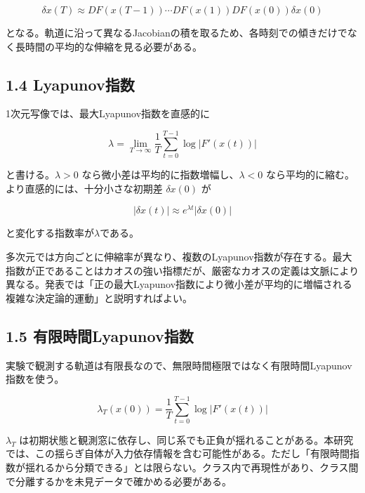 \documentclass[11pt,a4paper]{ltjsarticle}
\begin{document}
\[
\delta x(T)\approx DF\!\left(x(T-1)\right)\cdots DF\!\left(x(1)\right)DF\!\left(x(0)\right)\delta x(0)
\]

となる。軌道に沿って異なるJacobianの積を取るため、各時刻での傾きだけでなく長時間の平均的な伸縮を見る必要がある。\par

\subsection*{\textcolor{researchblue}{1.4 Lyapunov指数}}

1次元写像では、最大Lyapunov指数を直感的に\par

\[
\lambda=\lim_{T\to\infty}\frac{1}{T}\sum_{t=0}^{T-1}\log\left|F'\!\left(x(t)\right)\right|
\]

と書ける。\(\lambda>0\) なら微小差は平均的に指数増幅し、\(\lambda<0\) なら平均的に縮む。より直感的には、十分小さな初期差 \(\delta x(0)\) が\par

\[
\left|\delta x(t)\right|\approx e^{\lambda t}\left|\delta x(0)\right|
\]

と変化する指数率が\(\lambda\)である。\par

多次元では方向ごとに伸縮率が異なり、複数のLyapunov指数が存在する。最大指数が正であることはカオスの強い指標だが、厳密なカオスの定義は文脈により異なる。発表では「正の最大Lyapunov指数により微小差が平均的に増幅される複雑な決定論的運動」と説明すればよい。\par

\subsection*{\textcolor{researchblue}{1.5 有限時間Lyapunov指数}}

実験で観測する軌道は有限長なので、無限時間極限ではなく有限時間Lyapunov指数を使う。\par

\[
\lambda_T\!\left(x(0)\right)=\frac{1}{T}\sum_{t=0}^{T-1}\log\left|F'\!\left(x(t)\right)\right|
\]

\(\lambda_T\) は初期状態と観測窓に依存し、同じ系でも正負が揺れることがある。本研究では、この揺らぎ自体が入力依存情報を含む可能性がある。ただし「有限時間指数が揺れるから分類できる」とは限らない。クラス内で再現性があり、クラス間で分離するかを未見データで確かめる必要がある。\par
\end{document}
